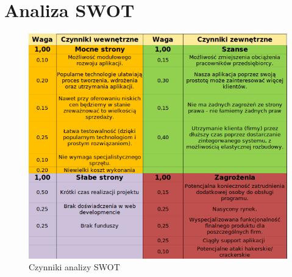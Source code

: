 \documentclass[12pt]{article}
\begin{document}
\section{Analiza SWOT}
\begin{figure}[H]
	\centering
	\includegraphics[scale=1.0]{img/swot1.png}
	\caption{Czynniki analizy SWOT}
\end{figure}
\end{document}
